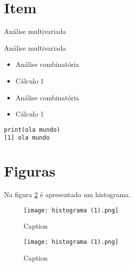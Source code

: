 \documentclass[12pt]{article} %
\begin{document}
\section{Item}

\begin{item}
 \item Análise multivariada 
 \item Análise multivariada
\end{item}

\begin{itemize}
\item Análise combinatória
\end{itemize}
\begin{itemize}
\item Cálculo 1
\end{itemize}

\begin{itemize}
\item[1] Análise combinatória
\item[2] Cálculo 1
\end{itemize}

\begin{lstlisting}
print(ola mundo)
[1] ola mundo
\end{lstlisting}

\newpage
\section{Figuras}
Na figura \ref{fig:my_label} é apresentado um histograma.
\begin{figure}[H]
    \centering
    \texttt{[image: histograma (1).png]}
    \caption{Caption}
    \label{histograma}
\end{figure}
\begin{figure}[H]
    \centering
    \texttt{[image: histograma (1).png]}
    \caption{Caption}
    \label{fig:my_label}
\end{figure}
\end{document}
